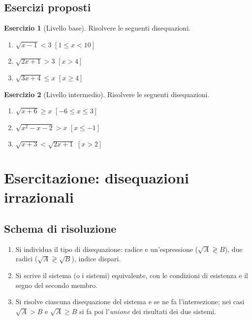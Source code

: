 \documentclass[12pt,a4paper,openany]{book}
\theoremstyle{definition}
\newtheorem{esercizio}{Esercizio}[section]
\theoremstyle{plain}
\theoremstyle{remark}
\begin{document}
\subsection*{Esercizi proposti}

\begin{esercizio}[Livello base]
Risolvere le seguenti disequazioni.
\begin{enumerate}[label=\alph*)]
\item $\sqrt{x-1}<3$ \hfill $[1\le x<10]$
\item $\sqrt{2x+1}>3$ \hfill $[x>4]$
\item $\sqrt{3x+4}\le x$ \hfill $[x\ge 4]$
\end{enumerate}
\end{esercizio}

\begin{esercizio}[Livello intermedio]
Risolvere le seguenti disequazioni.
\begin{enumerate}[label=\alph*)]
\item $\sqrt{x+6}\ge x$ \hfill $[-6\le x\le 3]$
\item $\sqrt{x^2-x-2}>x$ \hfill $[x\le -1]$
\item $\sqrt{x+3}<\sqrt{2x+1}$ \hfill $[x>2]$
\end{enumerate}
\end{esercizio}

\section{Esercitazione: disequazioni irrazionali}

\subsection*{Schema di risoluzione}

\begin{enumerate}[label=\arabic*)]
\item Si individua il tipo di disequazione: radice e un'espressione ($\sqrt{A}\gtrless B$), due radici ($\sqrt{A}\gtrless\sqrt{B}$), indice dispari.
\item Si scrive il sistema (o i sistemi) equivalente, con le condizioni di esistenza e il segno del secondo membro.
\item Si risolve ciascuna disequazione del sistema e se ne fa l'intersezione; nei casi $\sqrt{A}>B$ e $\sqrt{A}\ge B$ si fa poi l'\emph{unione} dei risultati dei due sistemi.
\end{enumerate}
\end{document}
